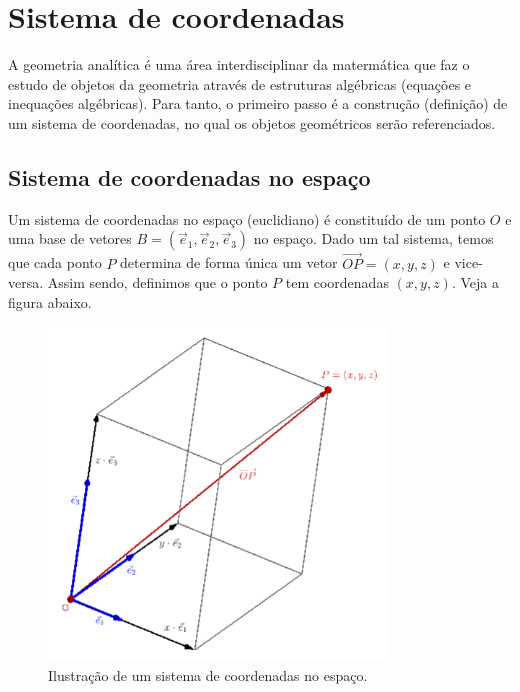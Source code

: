 
\chapter{Sistema de coordenadas}\label{cap_scoord}
\thispagestyle{fancy}

A geometria analítica é uma área interdisciplinar da matermática que faz o estudo de objetos da geometria através de estruturas algébricas (equações e inequações algébricas). Para tanto, o primeiro passo é a construção (definição) de um sistema de coordenadas, no qual os objetos geométricos serão referenciados.

\section{Sistema de coordenadas no espaço}\label{cap_scoord_sec_scoord}

Um sistema de coordenadas no espaço (euclidiano) é constituído de um ponto $O$ e uma base de vetores $B = (\vec{e}_1, \vec{e}_2, \vec{e}_3)$ no espaço. Dado um tal sistema, temos que cada ponto $P$ determina de forma única um vetor $\overrightarrow{OP} = (x,y,z)$ e vice-versa. Assim sendo, definimos que o ponto $P$ tem coordenadas $(x,y,z)$. Veja a figura abaixo.

\begin{figure}[H]
  \centering
  \includegraphics[width=0.8\textwidth]{cap_scoord/dados/fig_scoord/fig}
  \caption{Ilustração de um sistema de coordenadas no espaço.}
  \label{fig:scoord}
\end{figure}

